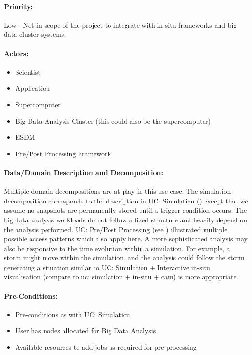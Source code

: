 \paragraph{Priority:}
Low - Not in scope of the project to integrate with in-situ frameworks and big data cluster systems.

\paragraph{Actors:}
\begin{itemize}
	\item Scientist
	\item Application
	\item Supercomputer
	\item Big Data Analysis Cluster (this could also be the supercomputer)
	\item ESDM
	\item Pre/Post Processing Framework
\end{itemize}


\paragraph{Data/Domain Description and Decomposition:}
Multiple domain decompositions are at play in this use case.
The simulation decomposition corresponds to the description in UC: Simulation () except that we assume no snapshots are permanently stored until a trigger condition occurs.
The big data analysis workloads do not follow a fixed structure and heavily depend on the analysis performed.
UC: Pre/Post Processing (see ) illustrated multiple possible access patterns which also apply here.
A more sophisticated analysis may also be responsive to the time evolution within a simulation. For example, a storm might move within the simulation, and the analysis could follow the storm generating a situation similar to UC: Simulation + Interactive in-situ visualisation (compare to {uc: simulation + in-situ + cam}) is more appropriate.




\paragraph{Pre-Conditions:}
\begin{itemize}
	\item Pre-conditions as with UC: Simulation
	\item User has nodes allocated for Big Data Analysis
	\item Available resources to add jobs as required for pre-processing
\end{itemize}

